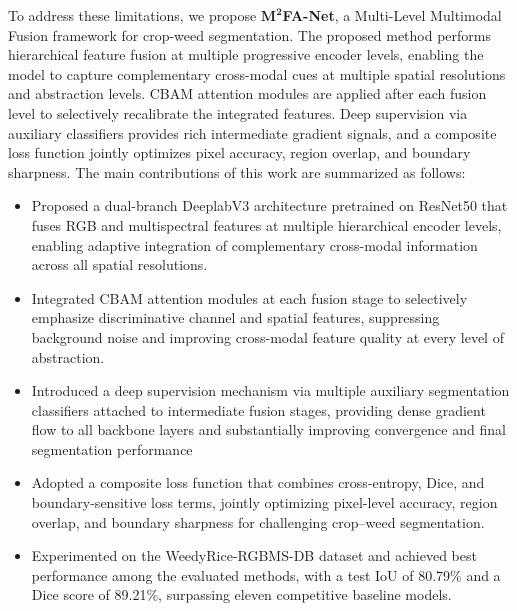 \documentclass[pdflatex,sn-mathphys-num]{sn-jnl}
\begin{document}
To address these limitations, we propose \textbf{$\mathbf{M^2}$FA-Net}, a Multi-Level Multimodal Fusion framework for crop-weed segmentation.
The proposed method performs hierarchical feature fusion at multiple progressive encoder levels, enabling the model to capture complementary cross-modal cues at multiple spatial resolutions and
abstraction levels. CBAM attention modules are applied after each fusion level to selectively recalibrate the integrated
features. Deep supervision via auxiliary classifiers provides rich intermediate gradient signals, and a composite loss
function jointly optimizes pixel accuracy, region overlap, and boundary sharpness. The main contributions of this work are summarized as follows:
\begin{itemize}
\item Proposed a dual-branch DeeplabV3 architecture pretrained on ResNet50 that fuses RGB and multispectral features at multiple hierarchical encoder levels, enabling adaptive integration of complementary cross-modal information across all spatial resolutions.
\item Integrated CBAM attention modules at each fusion stage to selectively emphasize discriminative channel and spatial features, suppressing background noise and improving cross-modal feature quality at every level of abstraction.
\item Introduced a deep supervision mechanism via multiple auxiliary segmentation classifiers attached to intermediate fusion stages, providing dense gradient flow to all backbone layers and substantially improving convergence and final segmentation performance
\item Adopted a composite loss function that combines cross-entropy, Dice, and boundary-sensitive loss terms, jointly optimizing pixel-level accuracy, region overlap, and boundary sharpness for challenging crop--weed segmentation.
\item Experimented on the WeedyRice-RGBMS-DB dataset and achieved best performance among the evaluated methods, with a test IoU of 80.79\% and a Dice score of 89.21\%, surpassing eleven competitive baseline models.

\end{itemize}
\end{document}
